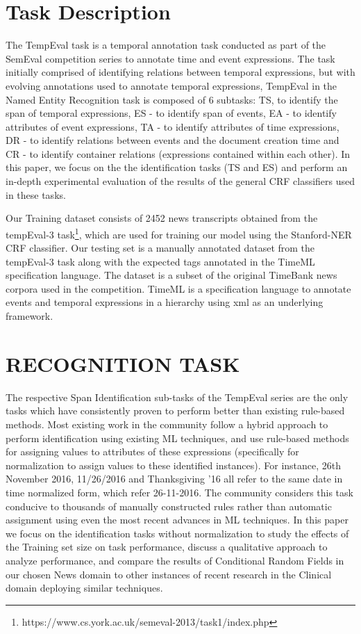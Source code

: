 \documentclass[letterpaper, 10 pt, conference]{ieeeconf}
\begin{document}
\section{Task Description}

The TempEval task is a temporal annotation task conducted as part of the SemEval competition series to annotate time and event expressions. The task initially comprised of identifying relations between temporal expressions, but with evolving annotations used to annotate temporal expressions, TempEval in the Named Entity Recognition task is composed of 6 subtasks: TS, to identify the span of temporal expressions, 
ES - to identify span of events, EA - to identify attributes of event expressions, TA - to identify attributes of time expressions, DR - to identify relations between events and the document creation time and CR - to identify container relations (expressions contained within each other). In this paper, we focus on the the identification tasks (TS and ES) and perform  an in-depth experimental evaluation of the results of the general CRF classifiers used in these tasks. 

Our Training dataset consists of 2452 news transcripts obtained from the tempEval-3 task\footnote[1]{https://www.cs.york.ac.uk/semeval-2013/task1/index.php}, which are used for training our model using the Stanford-NER CRF classifier. Our testing set is a manually annotated dataset from the tempEval-3 task along with the expected tags annotated in the TimeML specification language. The dataset is a subset of the original TimeBank news corpora used in the competition. TimeML is a specification language to annotate events and temporal expressions in a hierarchy using xml as an underlying framework.

\section{RECOGNITION TASK}

The respective Span Identification sub-tasks of the TempEval series are the only tasks which have consistently proven to perform better than existing rule-based methods. Most existing work in the community follow a hybrid approach to perform identification using existing ML techniques, and use rule-based methods for assigning values to attributes of these expressions (specifically for normalization to assign values to these identified instances). For instance, 26th November 2016, 11/26/2016 and Thanksgiving '16 all refer to the same date in time normalized form, which refer 26-11-2016. The community considers this task conducive to thousands of manually constructed rules rather than automatic assignment using even the most recent advances in ML techniques. In this paper we focus on the identification tasks without normalization to study the effects of the Training set size on task performance, discuss a qualitative approach to analyze performance, and compare the results of Conditional Random Fields in our chosen News domain to other instances of recent research in the Clinical domain deploying similar techniques.
\end{document}
